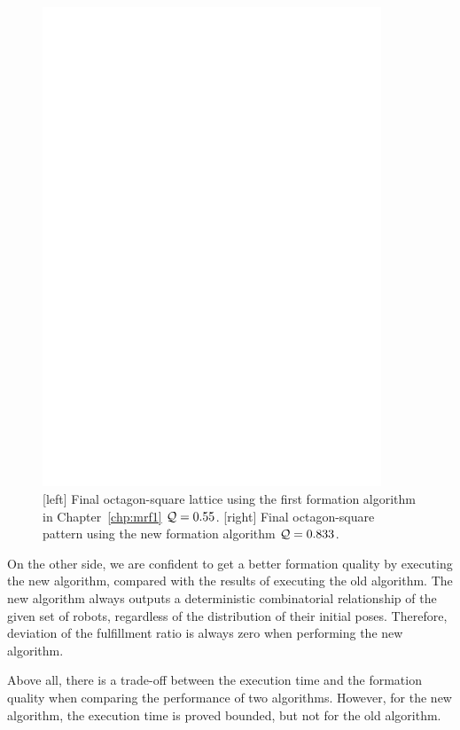 \begin{figure}
\begin{minipage}{0.45\linewidth}
            \includegraphics[width=0.9\textwidth]{figs/octsq40_new}
        \end{minipage}
        \caption{[left] Final octagon-square lattice using the first formation algorithm in Chapter~\ref{chp:mrf1} $\mathcal{Q}=0.55$. [right] Final octagon-square pattern using the new formation algorithm $\mathcal{Q}=0.833$.}
        \label{fig:forty_octsq_comp}
    \end{figure}

  On the other side, we are confident to get a better formation
  quality by executing the new algorithm, compared with the results of
  executing the old algorithm. 
  The new algorithm always outputs a
  deterministic combinatorial relationship of the given set of robots,
  regardless of the distribution of their initial poses. 
  Therefore, deviation of the fulfillment ratio
  is always zero when performing the new algorithm.


  Above all, there is a trade-off between the execution time and the
  formation quality when comparing the performance of two algorithms.
  However, for the new algorithm, the execution time is proved bounded,
  but not for the old algorithm.


